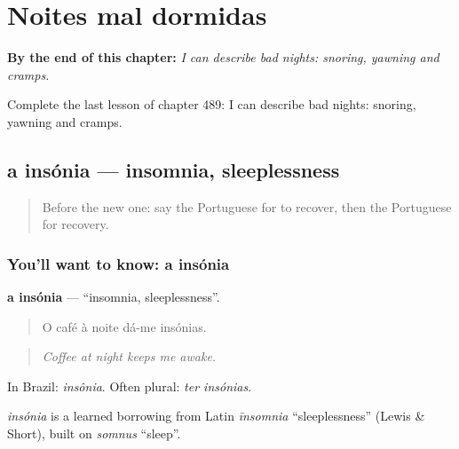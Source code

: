 
\chapter{Noites mal dormidas}
\label{ch:pt-noites-mal-dormidas}

\begin{chapteropening}
\textbf{By the end of this chapter:} \emph{I can describe bad nights: snoring, yawning and cramps.}

Complete the last lesson of chapter 489: I can describe bad nights: snoring, yawning and cramps.
\end{chapteropening}

\section[a insónia]{a insónia — insomnia, sleeplessness}

\label{lesson:PT-C489-insonia}



\begin{quote}
Before the new one: say the Portuguese for to recover, then the Portuguese for recovery.
\end{quote}

\subsection*{You'll want to know: a insónia}
\textbf{a insónia} — \textquotedblleft{}insomnia, sleeplessness\textquotedblright{}.

\begin{quote}
O café à noite dá-me insónias.
\end{quote}

\begin{quote}
\emph{Coffee at night keeps me awake.}
\end{quote}

In Brazil: \emph{insônia}. Often plural: \emph{ter insónias}.

\begin{cousinweb}
\emph{insónia} is a learned borrowing from Latin \emph{īnsomnia} \textquotedblleft{}sleeplessness\textquotedblright{} (Lewis \& Short), built on \emph{somnus} \textquotedblleft{}sleep\textquotedblright{}.
\end{cousinweb}


